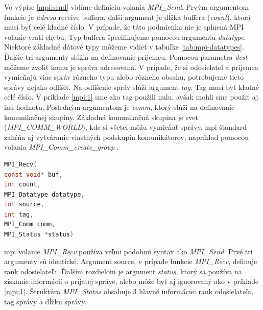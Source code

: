 Vo výpise \ref{mpi:send} vidíme definíciu volania \textit{MPI\_Send}. Prvým argumentom funkcie je \textit{adresa} receive buffera,
ďalší argument je dĺžka buffera (\textit{count}), ktorá musí byť celé kladné číslo.
V prípade, že táto podmienka nie je splnená MPI volanie vráti chybu. Typ buffera špecifikujeme pomocou argumentu \textit{datatype}.
Niektoré základné dátové typy môžeme vidieť v tabuľke \ref{tab:mpi-datatypes}.
Ďalšie tri argumenty slúžia na definovanie príjemcu. Pomocou parametra \textit{dest} môžeme zvoliť komu je správa adresovaná.
V prípade, že si odosielateľ a príjemca vymieňajú viac správ rôzneho typu alebo rôzneho obsahu, potrebujeme tieto správy nejako odlíšiť.
Na odlíšenie správ slúži argument \textit{tag}. Tag musí byť kladné celé číslo. V príklade \ref{mpi:1} sme ako tag použili nulu,
avšak mohli sme použiť aj inú hodnotu. Posledným argumentom je \textit{comm}, ktorý slúži na definovanie komunikačnej skupiny.
Základná komunikačná skupina je svet (\textit{MPI\_COMM\_WORLD}), kde si všetci môžu vymieňať správy.
\acrshort{mpi} štandard zahŕňa aj vytváranie vlastných podskupín komunikátorov, napríklad pomocou volania \textit{MPI\_Comm\_create\_group} \cite{mpi3-1}.

\begin{lstlisting}[language=c, caption={MPI\_Recv}, label={mpi:recv}]
MPI_Recv(
const void* buf,
int count,
MPI_Datatype datatype,
int source,
int tag,
MPI_Comm comm,
MPI_Status *status)
\end{lstlisting}

\acrshort{mpi} volanie \textit{MPI\_Recv} používa veľmi podobnú syntax ako \textit{MPI\_Send}. Prvé tri argumenty sú identické.
Argument source, v prípade funkcie \textit{MPI\_Recv}, definuje rank odosielateľa. Ďalším rozdielom je argument \textit{status},
ktorý sa používa na získanie informácií o prijatej správe, alebo môže byť aj ignorovaný ako v príklade \ref{mpi:1}.
Štruktúra \textit{MPI\_Status} obsahuje 3 hlavné informácie: rank odosielateľa, tag správy a dĺžku správy.

